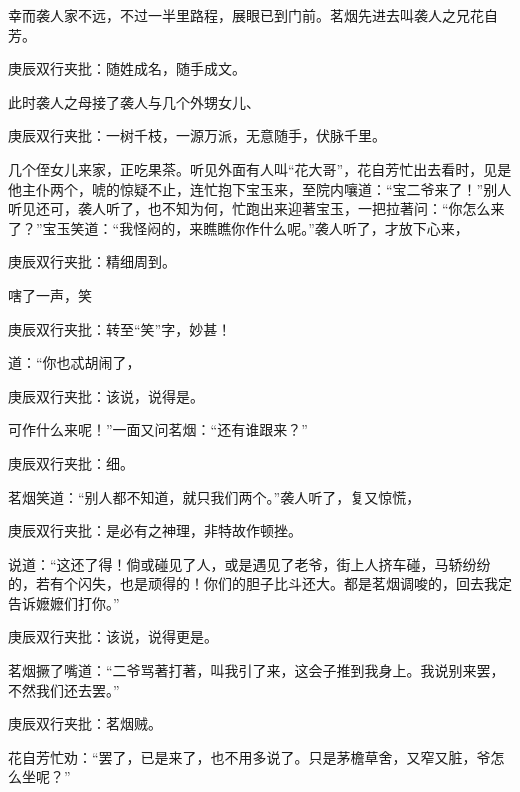 \begin{parag}


    幸而袭人家不远，不过一半里路程，展眼已到门前。茗烟先进去叫袭人之兄花自芳。\begin{note}庚辰双行夹批：随姓成名，随手成文。\end{note}此时袭人之母接了袭人与几个外甥女儿、\begin{note}庚辰双行夹批：一树千枝，一源万派，无意随手，伏脉千里。\end{note}几个侄女儿来家，正吃果茶。听见外面有人叫“花大哥”，花自芳忙出去看时，见是他主仆两个，唬的惊疑不止，连忙抱下宝玉来，至院内嚷道：“宝二爷来了！”别人听见还可，袭人听了，也不知为何，忙跑出来迎著宝玉，一把拉著问：“你怎么来了？”宝玉笑道：“我怪闷的，来瞧瞧你作什么呢。”袭人听了，才放下心来，\begin{note}庚辰双行夹批：精细周到。\end{note}嗐了一声，笑\begin{note}庚辰双行夹批：转至“笑”字，妙甚！\end{note}道：“你也忒胡闹了，\begin{note}庚辰双行夹批：该说，说得是。\end{note}可作什么来呢！”一面又问茗烟：“还有谁跟来？”\begin{note}庚辰双行夹批：细。\end{note}茗烟笑道：“别人都不知道，就只我们两个。”袭人听了，复又惊慌，\begin{note}庚辰双行夹批：是必有之神理，非特故作顿挫。\end{note}说道：“这还了得！倘或碰见了人，或是遇见了老爷，街上人挤车碰，马轿纷纷的，若有个闪失，也是顽得的！你们的胆子比斗还大。都是茗烟调唆的，回去我定告诉嬷嬷们打你。”\begin{note}庚辰双行夹批：该说，说得更是。\end{note}茗烟撅了嘴道：“二爷骂著打著，叫我引了来，这会子推到我身上。我说别来罢，不然我们还去罢。”\begin{note}庚辰双行夹批：茗烟贼。\end{note}花自芳忙劝：“罢了，已是来了，也不用多说了。只是茅檐草舍，又窄又脏，爷怎么坐呢？”
\end{parag}


